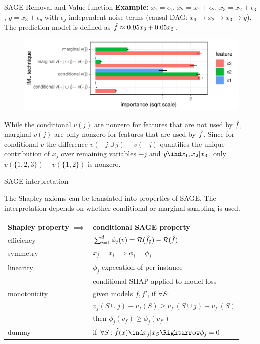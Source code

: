 \documentclass[11pt,compress,t,notes=noshow, xcolor=table]{beamer}
\begin{document}
\begin{vbframe}{SAGE Removal and Value function}
\textbf{Example:} $x_1 = \epsilon_1$, $x_2 = x_1 + \epsilon_2$, $x_3 = x_2 + \epsilon_3$, $y = x_3 + \epsilon_y$ with $\epsilon_j$ independent noise terms (causal DAG: $x_1 \rightarrow x_2 \rightarrow x_3 \rightarrow y$). The prediction model is defined as  $\fh \approx 0.95 x_3 + 0.05 x_2$. 
%
\begin{figure}
  \includegraphics[width=0.6\linewidth]{figure_man/sage_variants}
\end{figure}
%
While the conditional $v(j)$ are nonzero for features that are not used by $\fh$, marginal $v(j)$ are only nonzero for features that are used by $\fh$. 
Since for conditional $v$ the difference $v(-j \cup j) - v(-j)$ quantifies the unique contribution of $x_j$ over remaining variables $-j$ and $y \ind x_1, x_2 | x_3$, only $v(\{1,2,3\}) - v(\{1, 2\})$ is nonzero.
%
\end{vbframe}

\begin{vbframe}{SAGE interpretation}

The Shapley axioms can be translated into properties of SAGE. The interpretation depends on whether conditional or marginal sampling is used.
%
\begin{table}
  \centering
  \begin{tabular}{l | l }
  Shapley property $\implies$ & conditional SAGE property \\
  \hline
  efficiency & $\sum_{i=1}^d \phi_j(v) = \risk(\fh_\emptyset) - \risk(\fh)$\\
  symmetry & $x_j = x_i \implies \phi_i = \phi_j$ \\
  linearity & $\phi_j$ expecation of per-instance\\
  & conditional SHAP applied to model loss\\
  monotonicity & given models $f, f'$, if  $\forall S:$\\
  &$v_f(S \cup j) - v_f(S) \geq v_{f'}(S \cup j) - v_{f'}(S)$ \\
  &then $\phi_j(v_f) \geq \phi_j(v_{f'})$\\
  dummy & if $\forall S: \fh(x) \ind x_j | x_S \Rightarrow \phi_j = 0$
  \end{tabular}
\end{table}

\end{vbframe}
\end{document}
